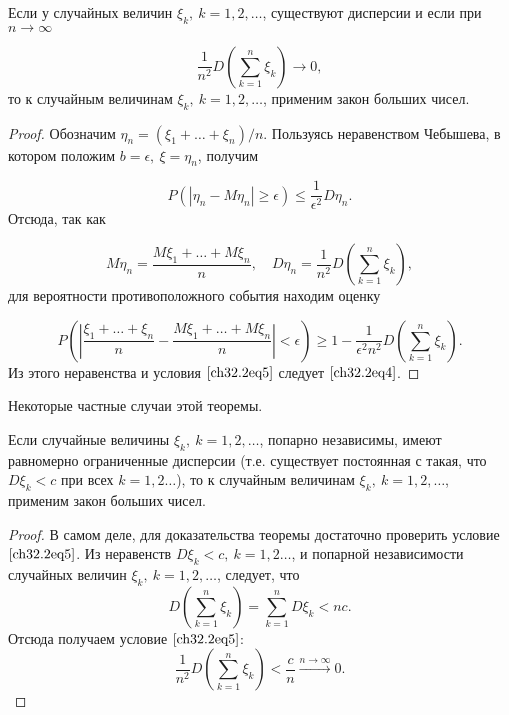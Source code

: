 \begin{thm} [Маркова]
Если у случайных величин $\xi_k, \: k = 1,2,\ldots$, существуют дисперсии и если при $n \to \infty$

\begin{equation} \label{ch32.2eq5}
\frac{1}{n^2} D  \left( \sum_{k  = 1}^{n} \xi_k\right) \to 0,
\end{equation}
то к случайным величинам $\xi_k, \: k = 1,2,\ldots$, применим закон больших чисел.
\end{thm}

\begin{proof}
Обозначим $\eta_n = (\xi_1 + \ldots + \xi_n) / n$. Пользуясь неравенством Чебышева, в котором положим $b = \epsilon, \: \xi = \eta_n$, получим

$$
P \left( \left| \eta_n - M  \eta_n \right| \ge \epsilon \right) \le \frac{1}{\epsilon^2} D  \eta_n.
$$
Отсюда, так как

$$
M  \eta_n = \frac{M \xi_1 + \ldots + M \xi_n}{n}, \quad D \eta_n = \frac{1}{n^2} D  \left( \sum_{k  = 1}^{n} \xi_k\right),
$$ 
для вероятности противоположного события находим оценку

$$
P \left( \left| \frac{\xi_1 + \ldots + \xi_n}{n} - \frac{M \xi_1 + \ldots + M \xi_n}{n} \right| < \epsilon \right) \ge 1 - \frac{1}{\epsilon^2n^2} D  \left( \sum_{k  = 1}^{n} \xi_k\right).
$$
Из этого неравенства и условия $\eqref{ch32.2eq5}$ следует $\eqref{ch32.2eq4}$.
\end{proof}

Некоторые частные случаи этой теоремы.

\begin{thm} [Чебышёва]
Если случайные величины $\xi_k, \: k = 1,2,\ldots$, попарно независимы, имеют равномерно ограниченные дисперсии (т.е. существует постоянная с такая, что $D  \xi_k < c$ при всех $k = 1, 2\ldots$),	то к случайным величинам $\xi_k, \: k = 1,2,\ldots$, применим закон больших чисел.
\end{thm}

\begin{proof}
В самом деле, для доказательства теоремы достаточно проверить условие $\eqref{ch32.2eq5}$. Из неравенств $D  \xi_k < c, \: k = 1, 2\ldots$, и попарной независимости случайных величин $\xi_k, \: k = 1,2,\ldots$, следует, что
$$
D  \left( \sum_{k  = 1}^{n} \xi_k\right) = \sum_{k  = 1}^{n} D  \xi_k  < nc.
$$
Отсюда получаем условие $\eqref{ch32.2eq5}$:
$$
\frac{1}{n^2} D  \left( \sum_{k  = 1}^{n} \xi_k\right) < \frac{c}{n} \xrightarrow{n \to \infty} 0.
$$
\end{proof}

